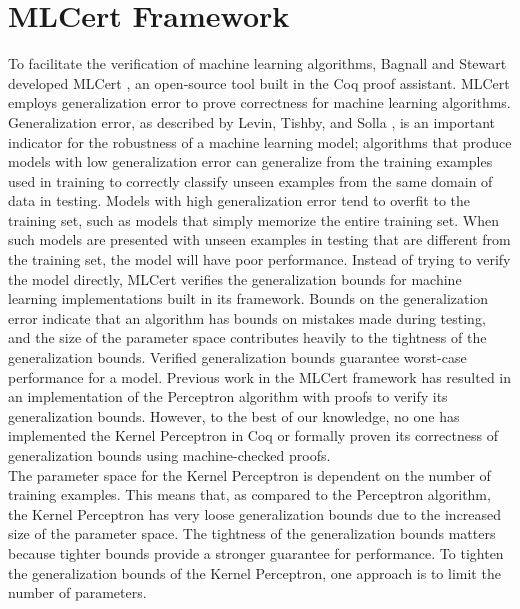 \section{MLCert Framework}\label{MLCertFrameworkSection}
To facilitate the verification of machine learning algorithms, Bagnall and Stewart developed MLCert \cite{BS19}, an open-source tool built in the Coq proof assistant. MLCert employs generalization error to prove correctness for machine learning algorithms. Generalization error, as described by Levin, Tishby, and Solla \cite{LTS90}, is an important indicator for the robustness of a machine learning model; algorithms that produce models with low generalization error can generalize from the training examples used in training to correctly classify unseen examples from the same domain of data in testing. Models with high generalization error tend to overfit to the training set, such as models that simply memorize the entire training set. When such models are presented with unseen examples in testing that are different from the training set, the model will have poor performance. Instead of trying to verify the model directly, MLCert verifies the generalization bounds for machine learning implementations built in its framework. Bounds on the generalization error indicate that an algorithm has bounds on mistakes made during testing, and the size of the parameter space contributes heavily to the tightness of the generalization bounds. Verified generalization bounds guarantee worst-case performance for a model. Previous work in the MLCert framework \cite{BS19} has resulted in an implementation of the Perceptron algorithm with proofs to verify its generalization bounds. However, to the best of our knowledge, no one has implemented the Kernel Perceptron in Coq or formally proven its correctness of generalization bounds using machine-checked proofs.
\\The parameter space for the Kernel Perceptron is dependent on the number of training examples. This means that, as compared to the Perceptron algorithm, the Kernel Perceptron has very loose generalization bounds due to the increased size of the parameter space. The tightness of the generalization bounds matters because tighter bounds provide a stronger guarantee for performance. To tighten the generalization bounds of the Kernel Perceptron, one approach is to limit the number of parameters.

